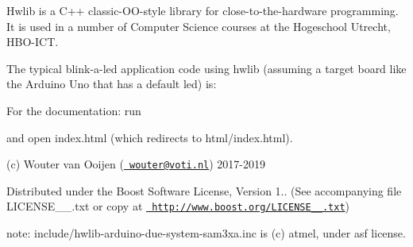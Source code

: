 Hwlib is a C++ classic-\/\+O\+O-\/style library for close-\/to-\/the-\/hardware programming. It is used in a number of Computer Science courses at the Hogeschool Utrecht, H\+B\+O-\/\+I\+CT.

The typical blink-\/a-\/led application code using hwlib (assuming a target board like the Arduino Uno that has a default led) is\+:


\begin{DoxyCode}{0}
\DoxyCodeLine{}
\DoxyCodeLine{\}}
\end{DoxyCode}


For the documentation\+: run 
\begin{DoxyCode}{0}
\end{DoxyCode}


and open index.\+html (which redirects to html/index.\+html).



(c) Wouter van Ooijen (\href{mailto:wouter@voti.nl}{\texttt{ wouter@voti.\+nl}}) 2017-\/2019

Distributed under the Boost Software License, Version 1.. (See accompanying file L\+I\+C\+E\+N\+S\+E\+\_\+\_.\+txt or copy at \href{http://www.boost.org/LICENSE_1_0.txt}{\texttt{ http\+://www.\+boost.\+org/\+L\+I\+C\+E\+N\+S\+E\+\_\+\_.\+txt}}) ~\newline


note\+: include/hwlib-\/arduino-\/due-\/system-\/sam3xa.\+inc is (c) atmel, under asf license. 